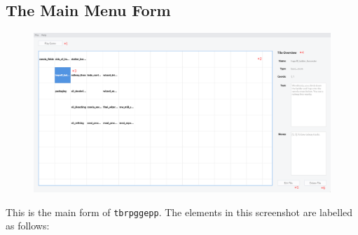 \documentclass[class=article,crop=false]{standalone} \usepackage[margin=1in,headheight=57pt,headsep=0.1in]{geometry}
\begin{document}
\subsection{The Main Menu Form}
\begin{figure}[H]
	\centering
	\includegraphics[width=1.0\textwidth]{./mainMenuForm.png}
\end{figure}
This is the main form of \texttt{tbrpggepp}. The elements in this screenshot are labelled as follows:
\end{document}
